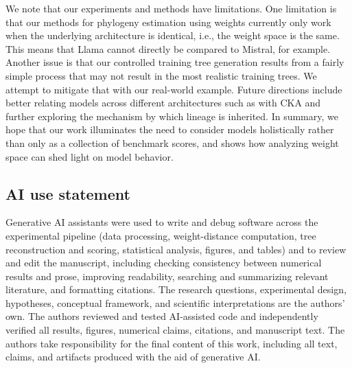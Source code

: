 \documentclass{article}
\theoremstyle{definition}
\theoremstyle{plain}
\begin{document}
We note that our experiments and methods have limitations.  One limitation is that our methods for phylogeny estimation using weights currently only work when the underlying architecture is identical, i.e., the weight space is the same.  This means that Llama cannot directly be compared to Mistral, for example. Another issue is that our controlled training tree generation results from a fairly simple process that may not result in the most realistic training trees.  We attempt to mitigate that with our real-world example. Future directions include better relating models across different architectures such as with CKA and further exploring the mechanism by which lineage is inherited. In summary, we hope that our work illuminates the need to consider models holistically rather than only as a collection of benchmark scores, and shows how analyzing weight space can shed light on model behavior.



\subsection*{AI use statement}
Generative AI assistants were used to write and debug software across the experimental
pipeline (data processing, weight-distance computation, tree reconstruction and scoring, statistical
analysis, figures, and tables) and to review and edit the manuscript, including checking consistency between numerical results and prose,
improving readability, searching and summarizing relevant literature, and formatting citations.  The research questions, experimental design,
hypotheses, conceptual framework, and scientific interpretations are the authors' own. The authors
reviewed and tested AI-assisted code and independently verified all results, figures, numerical claims,
citations, and manuscript text. The authors take responsibility for the final content of this work,
including all text, claims, and artifacts produced with the aid of generative AI.





\appendix
\end{document}
